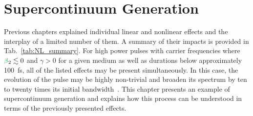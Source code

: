 \chapter{Supercontinuum Generation}
\label{ch:supercontinuum}

Previous chapters explained individual linear and nonlinear effects and the interplay of a limited number of them. A summary of their impacts is provided in Tab.~\ref{tab:NL_summary}. For high power pulses with carrier frequencies where $\betag_2\lesssim 0$ and $\gamma>0$ for a given medium as well as durations below approximately 100~fs, all of the listed effects may be present simultaneously. In this case, the evolution of the pulse may be highly non-trivial and broaden its spectrum by ten to twenty times its initial bandwidth~\cite{supercontinuum_original_paper}. This chapter presents an example of supercontinuum generation and explains how this process can be understood in terms of the previously presented effects.   


